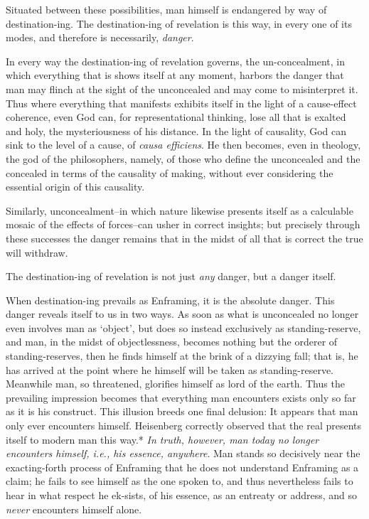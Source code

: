 \documentclass[12pt]{article}
\begin{document}
Situated between these possibilities, man himself is endangered by way of destination-ing. The destination-ing of revelation is this way, in every one of its modes, and therefore is necessarily, \textit{danger}.

In every way the destination-ing of revelation governs, the un-concealment, in which everything that is shows itself at any moment, harbors the danger that man may flinch at the sight of the unconcealed and may come to misinterpret it. Thus where everything that manifests exhibits itself in the light of a cause-effect coherence, even God can, for representational thinking, lose all that is exalted and holy, the mysteriousness of his distance. In the light of causality, God can sink to the level of a cause, of \textit{causa efficiens}. He then becomes, even in theology, the god of the philosophers, namely, of those who define the unconcealed and the concealed in terms of the causality of making, without ever considering the essential origin of this causality.

Similarly, unconcealment--in which nature likewise presents itself as a calculable mosaic of the effects of forces--can usher in correct insights; but precisely through these successes the danger remains that in the midst of all that is correct the true will withdraw.

The destination-ing of revelation is not just \textit{any} danger, but a danger itself.

When destination-ing prevails as Enframing, it is the absolute danger. This danger reveals itself to us in two ways. As soon as what is unconcealed no longer even involves man as `object', but does so instead exclusively as standing-reserve, and man, in the midst of objectlessness, becomes nothing but the orderer of standing-reserves, then he finds himself at the brink of a dizzying fall; that is, he has arrived at the point where he himself will be taken as standing-reserve. Meanwhile man, so threatened, glorifies himself as lord of the earth. Thus the prevailing impression becomes that everything man encounters exists only so far as it is his construct. This illusion breeds one final delusion: It appears that man only ever encounters himself. Heisenberg correctly observed that the real presents itself to modern man this way.* \textit{In truth, however, man today no longer encounters himself, i.e., his essence, anywhere}. Man stands so decisively near the exacting-forth process of Enframing that he does not understand Enframing as a claim; he fails to see himself as the one spoken to, and thus nevertheless fails to hear in what respect he ek-sists, of his essence, as an entreaty or address, and so \textit{never} encounters himself alone.
\end{document}
